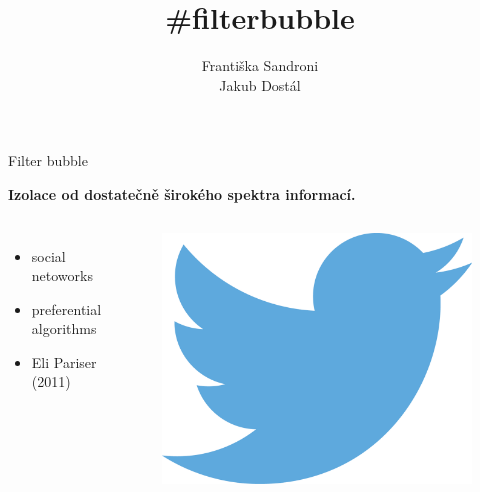 \documentclass[notheorems,12pt]{beamer}
\title[]{\#filterbubble}
\date{}
\author{Františka Sandroni\\
        Jakub Dostál}
\institute{}
\begin{document}
\maketitle
\begin{frame}{Filter bubble}
    \center
    \vspace{-0.1cm}
    \begin{large}\textbf{Izolace od dostatečně širokého spektra informací.}\end{large}
    \vspace{0.8cm}
    \begin{columns}
    \column{5cm}
    \begin{itemize}
        \item social netoworks
        \item preferential algorithms
        \item Eli Pariser (2011)
    \end{itemize}
    \column{6cm}
        \begin{figure}
            \centering
            \includegraphics[scale=0.4]{./Pics/twitter.png}
        \end{figure}
    \end{columns}
\end{frame}
\end{document}
